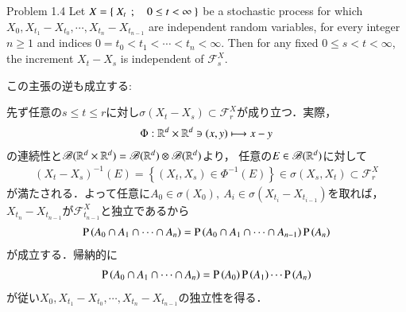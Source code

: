 \begin{itembox}[l]{Problem 1.4}
\label{thm:application_dynkin_system_theorem_to_independence}
		Let $X = \left\{\ X_t\ \, ; \quad 0 \leq t < \infty\ \right\}$ be a stochastic process 
		for which $X_0,X_{t_1} - X_{t_0}, \cdots, X_{t_n} - X_{t_{n-1}}$ are 
		independent random variables, for every integer $n \geq 1$ and indices 
		$0 = t_0 < t_1 < \cdots < t_n < \infty$. Then for any fixed $0 \leq s < t < \infty$, 
		the increment $X_t - X_s$ is independent of $\mathscr{F}^X_s$.
\end{itembox}
この主張の逆も成立する:
\begin{prf}
	先ず任意の$s \leq t \leq r$に対し$\sigma(X_t - X_s) \subset \mathscr{F}^X_r$が成り立つ．実際，
	\begin{align}
		\Phi:\mathbb{R}^d \times \mathbb{R}^d \ni (x,y) \longmapsto x - y
	\end{align}
	の連続性と$\mathscr{B}(\mathbb{R}^d \times \mathbb{R}^d) = \mathscr{B}(\mathbb{R}^d) \otimes \mathscr{B}(\mathbb{R}^d)$より，
	任意の$E \in \mathscr{B}(\mathbb{R}^d)$に対して
	\begin{align}
		(X_t - X_s)^{-1}(E) 
		= \left\{ \left( X_t,X_s \right) \in \Phi^{-1}(E) \right\}
		\in \sigma(X_s,X_t) \subset \mathscr{F}^X_r
		\label{eq:thm_application_dynkin_system_theorem_to_independence_1}
	\end{align}
	が満たされる．よって任意に$A_0 \in \sigma(X_0),\ A_i \in \sigma(X_{t_i} - X_{t_{i-1}})$を取れば，
	$X_{t_n} - X_{t_{n-1}}$が$\mathscr{F}^X_{t_{n-1}}$と独立であるから
	\begin{align}
		\operatorname{P} \left(A_0 \cap A_1 \cap \cdots \cap A_n\right)
		= \operatorname{P} \left(A_0 \cap A_1 \cap \cdots \cap A_{n-1}\right) \operatorname{P} \left(A_n\right)
	\end{align}
	が成立する．帰納的に
	\begin{align}
		\operatorname{P} \left(A_0 \cap A_1 \cap \cdots \cap A_n\right)
		= \operatorname{P} \left(A_0\right) \operatorname{P} \left(A_1\right) \cdots \operatorname{P} \left(A_n\right)
	\end{align}
	が従い$X_0,X_{t_1} - X_{t_0}, \cdots, X_{t_n} - X_{t_{n-1}}$の独立性を得る．
	\QED
\end{prf}

